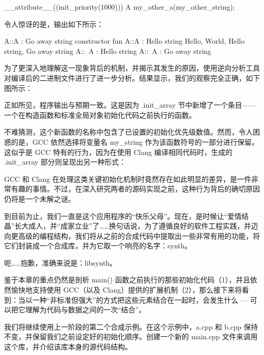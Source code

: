 \begin{cpp}
__attribute__((init_priority(1000)))
A my_other_a(my_other_string);
\end{cpp}

令人惊讶的是，输出如下所示：

\begin{shell}
A::A : Go away string
constructor fun
A::A : Hello string
Hello, World, Hello string, Go away string
A::~A : Hello string
A::~A : Go away string
\end{shell}

为了更深入地理解这一现象背后的机制，并揭示其发生的原因，使用逆向分析工具对编译后的二进制文件进行了进一步分析。结果显示，我们的观察完全正确，如下图所示：


正如所见，程序输出与预期一致。这是因为 .init\_array 节中新增了一个条目——一个在构造函数和标准全局对象初始化代码之前执行的函数。

不难猜测，这个新函数的名称中包含了已设置的初始化优先级数值。然而，令人困惑的是，GCC 依然选择将变量名 my\_string 作为该函数符号的一部分进行保留。这似乎是 GCC 特有的行为，因为在使用 Clang 编译相同代码时，生成的 .init\_array 部分则呈现出另一种形式：


GCC 和 Clang 在处理这类关键初始化机制时竟然存在如此明显的差异，是一件非常有趣的事情。不过，在深入研究两者的源码实现之前，这种行为背后的确切原因仍将是一个未解之谜。


到目前为止，我们一直是这个应用程序的“快乐父母”。现在，是时候让“爱情结晶”长大成人，并“成家立业”了……换句话说，为了遵循良好的软件工程实践，并迈向更高级的编程结构，我们将从之前的合成代码中提取出一些非常有用的功能，将它们封装成一个合成库，并为它取一个响亮的名字：synth。

呃……抱歉，准确来说是：libsynth。

鉴于本章的重点仍然是剖析 main() 函数之前执行的那些初始化代码（1），并且依然愉快地支持使用 GCC（以及 Clang）提供的扩展机制（2），那么接下来将看到：当以一种“非标准但强大”的方式把这些元素结合在一起时，会发生什么 --- 可以把它理解为代码与数据之间的一次“结合”。

我们将继续使用上一阶段的第二个合成示例。在这个示例中，a.cpp 和 b.cpp 保持不变，并保留我们之前设定好的初始化顺序。创建一个新的 main.cpp 文件来调用这个库，并介绍该库本身的源代码结构。

